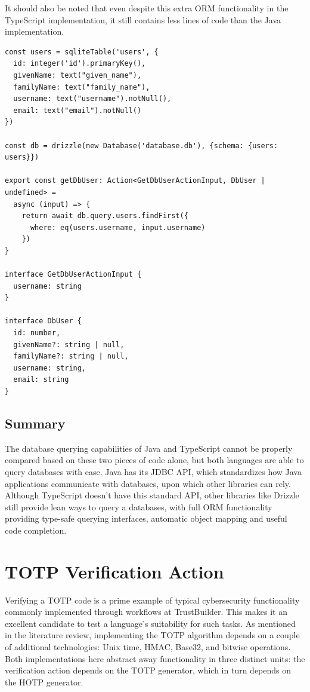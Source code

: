 It should also be noted that even despite this extra ORM functionality in the TypeScript implementation, it still contains less lines of code than the Java implementation. 
\begin{listing}[H]
    \begin{verbatim}
const users = sqliteTable('users', {
  id: integer('id').primaryKey(),
  givenName: text("given_name"),
  familyName: text("family_name"),
  username: text("username").notNull(),
  email: text("email").notNull()
})

const db = drizzle(new Database('database.db'), {schema: {users: users}})

export const getDbUser: Action<GetDbUserActionInput, DbUser | undefined> = 
  async (input) => {
    return await db.query.users.findFirst({
      where: eq(users.username, input.username)
    })
}

interface GetDbUserActionInput {
  username: string
}

interface DbUser {
  id: number,
  givenName?: string | null,
  familyName?: string | null,
  username: string,
  email: string
}
    \end{verbatim}
    \caption{\label{lst:db-ts}Database query action in TypeScript}
\end{listing}
\subsection{Summary}
The database querying capabilities of Java and TypeScript cannot be properly compared based on these two pieces of code alone, but both languages are able to query databases with ease. Java has its JDBC API, which standardizes how Java applications communicate with databases, upon which other libraries can rely. Although TypeScript doesn't have this standard API, other libraries like Drizzle still provide lean ways to query a databases, with full ORM functionality providing type-safe querying interfaces, automatic object mapping and useful code completion.

\pagebreak
\section{TOTP Verification Action}
Verifying a TOTP code is a prime example of typical cybersecurity functionality commonly implemented through workflows at TrustBuilder. This makes it an excellent candidate to test a language's suitability for such tasks. As mentioned in the literature review, implementing the TOTP algorithm depends on a couple of additional technologies: Unix time, HMAC, Base32, and bitwise operations. Both implementations here abstract away functionality in three distinct units: the verification action depends on the TOTP generator, which in turn depends on the HOTP generator.
